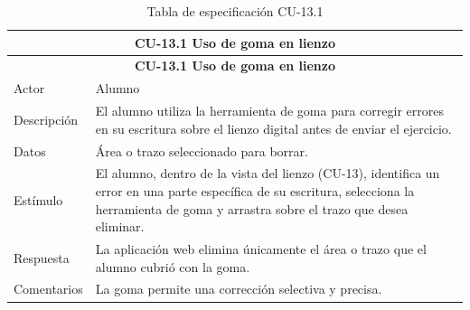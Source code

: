 \begin{longtable}{|p{4cm}|p{11cm}|}
\caption{Tabla de especificación CU-13.1}
\label{tab:cu13-1} \\

\hline
\multicolumn{2}{|c|}{\textbf{CU-13.1 Uso de goma en lienzo}} \\
\hline
\endfirsthead

\hline
\multicolumn{2}{|c|}{\textbf{CU-13.1 Uso de goma en lienzo}} \\
\hline
\endhead

\hline
\endfoot
\endlastfoot

Actor & Alumno \\
\hline

Descripción & El alumno utiliza la herramienta de goma para corregir errores en su escritura sobre el lienzo digital antes de enviar el ejercicio. \\
\hline

Datos & Área o trazo seleccionado para borrar. \\
\hline

Estímulo & El alumno, dentro de la vista del lienzo (CU-13), identifica un error en una parte específica de su escritura, selecciona la herramienta de goma y arrastra sobre el trazo que desea eliminar. \\
\hline

Respuesta & La aplicación web elimina únicamente el área o trazo que el alumno cubrió con la goma. \\
\hline

Comentarios & La goma permite una corrección selectiva y precisa. \\
\hline

\end{longtable}

